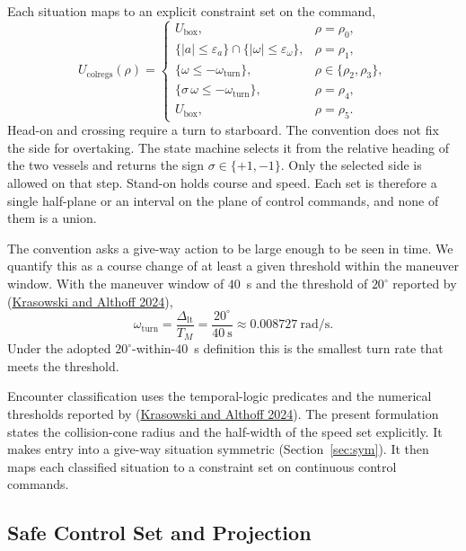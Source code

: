 \documentclass[10pt,letterpaper]{article}
\newcommand{\citl}[2]{(\hyperlink{ref:#1}{#2})}
\begin{document}
 Each situation maps to an explicit constraint set
on the command,
\begin{equation}
 U_{\mathrm{colregs}}(\rho)=
 \begin{cases}
  U_{\mathrm{box}}, & \rho=\rho_0,\\[2pt]
  \{|a|\le\varepsilon_a\}\cap\{|\omega|\le\varepsilon_\omega\}, & \rho=\rho_1,\\[2pt]
  \{\omega\le-\omega_{\mathrm{turn}}\}, & \rho\in\{\rho_2,\rho_3\},\\[2pt]
  \{\sigma\,\omega\le-\omega_{\mathrm{turn}}\}, & \rho=\rho_4,\\[2pt]
  U_{\mathrm{box}}, & \rho=\rho_5.
 \end{cases}
 \label{eq:ucolregs}
\end{equation}
Head-on and crossing require a turn to starboard. The convention does not fix the side for overtaking. The state machine selects it from
the relative heading of the two vessels and returns the sign $\sigma\in\{+1,-1\}$. Only
the selected side is allowed on that step. Stand-on holds course and speed. Each set is therefore a
single half-plane or an interval on the plane of control commands, and none of them is a
union.

 The convention asks a give-way
action to be large enough to be seen in time. We quantify this as a course change of at
least a given threshold within the maneuver window. With the maneuver window of $40$~s
and the threshold of $20^\circ$ reported by \citl{krasowski2024}{Krasowski and Althoff
2024},
\begin{equation}
 \omega_{\mathrm{turn}}=\frac{\Delta_{\mathrm{lt}}}{T_M}=\frac{20^\circ}{40~\mathrm{s}}\approx 0.008727~\mathrm{rad/s}.
 \label{eq:omegaturn}
\end{equation}
Under the adopted $20^\circ$-within-$40$~s definition this is the smallest turn rate
that meets the threshold.

Encounter classification uses the temporal-logic predicates and the numerical thresholds
reported by \citl{krasowski2024}{Krasowski and Althoff 2024}. The present formulation states the collision-cone radius and the half-width of the speed
set explicitly. It makes entry into a give-way situation symmetric
(Section~\ref{sec:sym}). It then maps each classified situation to a constraint set on
continuous control commands.

\subsection{Safe Control Set and Projection}
\label{sec:proj}
\end{document}
